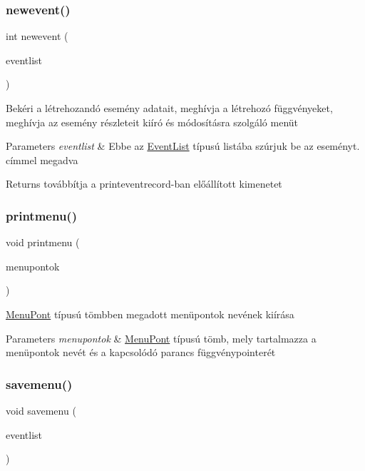\subsubsection{\texorpdfstring{newevent()}{newevent()}}
{\footnotesize\ttfamily int newevent (\begin{DoxyParamCaption}\item[{\hyperlink{struct_event_list}{Event\+List} $\ast$}]{eventlist }\end{DoxyParamCaption})}

Bekéri a létrehozandó esemény adatait, meghívja a létrehozó függvényeket, meghívja az esemény részleteit kiíró és módosításra szolgáló menüt 
\begin{DoxyParams}{Parameters}
{\em eventlist} & Ebbe az \hyperlink{struct_event_list}{Event\+List} típusú listába szúrjuk be az eseményt. címmel megadva \\
\hline
\end{DoxyParams}
\begin{DoxyReturn}{Returns}
továbbítja a printeventrecord-\/ban előállított kimenetet 
\end{DoxyReturn}
\mbox{\label{group__menu_gac95f6c8c1de4749a4ae8fb342329e6dc}} 
\subsubsection{\texorpdfstring{printmenu()}{printmenu()}}
{\footnotesize\ttfamily void printmenu (\begin{DoxyParamCaption}\item[{\hyperlink{struct_menu_pont}{Menu\+Pont} const $\ast$}]{menupontok }\end{DoxyParamCaption})}

\hyperlink{struct_menu_pont}{Menu\+Pont} típusú tömbben megadott menüpontok nevének kiírása 
\begin{DoxyParams}{Parameters}
{\em menupontok} & \hyperlink{struct_menu_pont}{Menu\+Pont} típusú tömb, mely tartalmazza a menüpontok nevét és a kapcsolódó parancs függvénypointerét \\
\hline
\end{DoxyParams}
\mbox{\label{group__menu_ga1e8bbce91606e9498fafa46cf96477d0}} 
\subsubsection{\texorpdfstring{savemenu()}{savemenu()}}
{\footnotesize\ttfamily void savemenu (\begin{DoxyParamCaption}\item[{\hyperlink{struct_event_list}{Event\+List} const $\ast$}]{eventlist }\end{DoxyParamCaption})}

